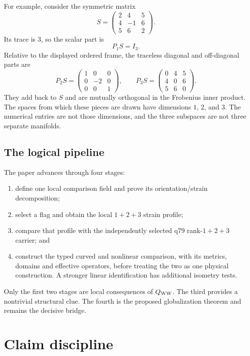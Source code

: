\documentclass[11pt]{article}
\begin{document}
For example, consider the symmetric matrix
\[
 S=
 \begin{pmatrix}
 2&4&5\\
 4&-1&6\\
 5&6&2
 \end{pmatrix}.
\]
Its trace is $3$, so the scalar part is
\[
 P_1S=I_3.
\]
Relative to the displayed ordered frame, the traceless diagonal and
off-diagonal parts are
\[
 P_2S=
 \begin{pmatrix}
 1&0&0\\
 0&-2&0\\
 0&0&1
 \end{pmatrix},
 \qquad
 P_3S=
 \begin{pmatrix}
 0&4&5\\
 4&0&6\\
 5&6&0
 \end{pmatrix}.
\]
They add back to $S$ and are mutually orthogonal in the Frobenius inner
product.  The spaces from which these pieces are drawn have dimensions
$1$, $2$, and $3$.  The numerical entries are not those dimensions, and the
three subspaces are not three separate manifolds.

\subsection{The logical pipeline}

The paper advances through four stages:
\begin{enumerate}
\item define one local comparison field and prove its orientation/strain
decomposition;
\item select a flag and obtain the local $1+2+3$ strain profile;
\item compare that profile with the independently selected q79 rank-$1+2+3$
carrier; and
\item construct the typed curved and nonlinear comparison, with its metrics,
domains and effective operators, before treating the two as one physical
construction. A stronger linear identification has additional isometry tests.
\end{enumerate}
Only the first two stages are local consequences of $Q_{\rm WW}$.  The third
provides a nontrivial structural clue.  The fourth is the proposed
globalization theorem and remains the decisive bridge.

\section{Claim discipline}
\end{document}
